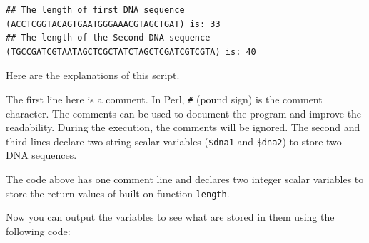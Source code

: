 \documentclass[]{book}
\makeatletter
\newenvironment{Shaded}{\begin{snugshade}}{\end{snugshade}}
\newcommand{\CharTok}[1]{\textcolor[rgb]{0.31,0.60,0.02}{#1}}
\newcommand{\CommentTok}[1]{\textcolor[rgb]{0.56,0.35,0.01}{\textit{#1}}}
\newcommand{\DataTypeTok}[1]{\textcolor[rgb]{0.13,0.29,0.53}{#1}}
\newcommand{\FunctionTok}[1]{\textcolor[rgb]{0.00,0.00,0.00}{#1}}
\newcommand{\KeywordTok}[1]{\textcolor[rgb]{0.13,0.29,0.53}{\textbf{#1}}}
\newcommand{\NormalTok}[1]{#1}
\newcommand{\StringTok}[1]{\textcolor[rgb]{0.31,0.60,0.02}{#1}}
\newenvironment{kframe}{%
\medskip{}
\setlength{\fboxsep}{.8em}
 \def\at@end@of@kframe{}%
 \ifinner\ifhmode%
  \def\at@end@of@kframe{\end{minipage}}%
  \begin{minipage}{\columnwidth}%
 \fi\fi%
 \def\FrameCommand##1{\hskip\@totalleftmargin \hskip-\fboxsep
 \colorbox{shadecolor}{##1}\hskip-\fboxsep
     \hskip-\linewidth \hskip-\@totalleftmargin \hskip\columnwidth}%
 \MakeFramed {\advance\hsize-\width
   \@totalleftmargin\z@ \linewidth\hsize
   \@setminipage}}%
 {\par\unskip\endMakeFramed%
 \at@end@of@kframe}
\renewenvironment{Shaded}{\begin{kframe}}{\end{kframe}}
\makeatother
\begin{document}
\begin{verbatim}
## The length of first DNA sequence (ACCTCGGTACAGTGAATGGGAAACGTAGCTGAT) is: 33
## The length of the Second DNA sequence (TGCCGATCGTAATAGCTCGCTATCTAGCTCGATCGTCGTA) is: 40
\end{verbatim}

Here are the explanations of this script.

\begin{Shaded}
\end{Shaded}

The first line here is a comment. In Perl, \texttt{\#} (pound sign) is the comment character. The comments can be used to document the program and improve the readability. During the execution, the comments will be ignored. The second and third lines declare two string scalar variables (\texttt{\$dna1} and \texttt{\$dna2}) to store two DNA sequences.

\begin{Shaded}
\end{Shaded}

The code above has one comment line and declares two integer scalar variables to store the return values of built-on function \texttt{length}.

Now you can output the variables to see what are stored in them using the following code:

\begin{Shaded}
\end{Shaded}
\end{document}
